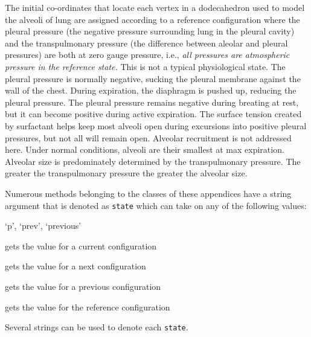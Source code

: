 The initial co-ordinates that locate each vertex in a dodecahedron used to model the alveoli of lung are assigned according to a reference configuration where the pleural pressure (the negative pressure surrounding lung in the pleural cavity) and the transpulmonary pressure (the difference between aleolar and pleural pressures) are both at zero gauge pressure, i.e., \textit{all pressures are atmospheric pressure in the reference state.}  This is not a typical physiological state.  The pleural pressure is normally negative, sucking the pleural membrane against the wall of the chest.  During expiration, the diaphragm is pushed up, reducing the pleural pressure.  The pleural pressure remains negative during breating at rest, but it can become positive during active expiration.  The surface tension created by surfactant helps keep most alveoli open during excursions into positive pleural pressures, but not all will remain open. Alveolar recruitment is not addressed here.  Under normal conditions, alveoli are their smallest at max expiration.  Alveolar size is predominately determined by the transpulmonary pressure.  The greater the transpulmonary pressure the greater the alveolar size.

Numerous methods belonging to the classes of these appendices have a string argument that is denoted as \texttt{state}  which can take on any of the following values:
\begin{labeling}{`p', `prev', `previous'}
\item [`c', `curr', `current'] gets the value for a current configuration 
\item [`n', `next'] gets the value for a next configuration 
\item [`p', `prev', `previous'] gets the value for a previous configuration 
\item [`r', `ref', `reference'] gets the value for the reference configuration 
\end{labeling}
Several strings can be used to denote each \texttt{state}.

